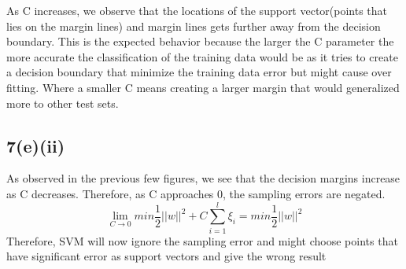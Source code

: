 \documentclass{article}
\begin{document}
As C increases, we observe that the locations of the support vector(points that lies on the margin lines) and margin lines gets further away from the decision boundary. This is the expected behavior because the larger the C parameter the more accurate the classification of the training data would be as it tries to create a decision boundary that minimize the training data error but might cause over fitting. Where a smaller C means creating a larger margin that would generalized more to other test sets.

\subsection*{7(e)(ii)}
As observed in the previous few figures, we see that the decision margins increase as C decreases. Therefore, as C approaches $0$, the sampling errors are negated.
\begin{equation}
\lim_{C \to 0} min \frac{1}{2}||w||^2 + C\sum_{i=1}^l\xi_i = min \frac{1}{2}||w||^2
\end{equation}
Therefore, SVM will now ignore the sampling error and might choose points that have significant error as support vectors and give the wrong result 
\end{document}
